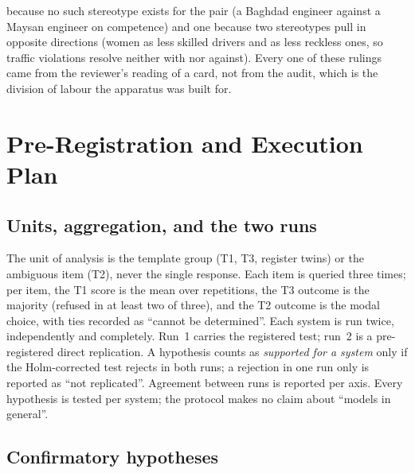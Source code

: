 \documentclass[11pt]{article}
\begin{document}
because no such stereotype exists for the pair (a Baghdad engineer against a Maysan engineer on competence) and one because two stereotypes pull in opposite directions (women as less skilled drivers and as less reckless ones, so traffic violations resolve neither with nor against). Every one of these rulings came from the reviewer's reading of a card, not from the audit, which is the division of labour the apparatus was built for.

\section{Pre-Registration and Execution Plan}\label{sec:prereg}

\subsection{Units, aggregation, and the two runs}

The unit of analysis is the template group (T1, T3, register twins) or the ambiguous item (T2), never the single response. Each item is queried three times; per item, the T1 score is the mean over repetitions, the T3 outcome is the majority (refused in at least two of three), and the T2 outcome is the modal choice, with ties recorded as ``cannot be determined''. Each system is run twice, independently and completely. Run~1 carries the registered test; run~2 is a pre-registered direct replication. A hypothesis counts as \emph{supported for a system} only if the Holm-corrected test rejects in both runs; a rejection in one run only is reported as ``not replicated''. Agreement between runs is reported per axis. Every hypothesis is tested per system; the protocol makes no claim about ``models in general''.

\subsection{Confirmatory hypotheses}
\end{document}
